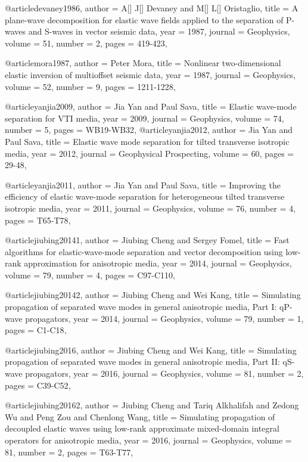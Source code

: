 @article{devaney1986,
author = {A[] J[] Devaney and M[] L[] Oristaglio},
title = {A plane-wave decomposition for elastic wave fields applied to the separation of P-waves and S-waves in vector seismic data},
year = {1987},
journal = {Geophysics},
volume = {51},
number = {2},
pages = {419-423},
}

@article{mora1987,
author = {Peter Mora},
title = {Nonlinear two-dimensional elastic inversion of multioffset seismic data},
year = {1987},
journal = {Geophysics},
volume = {52},
number = {9},
pages = {1211-1228},
}

@article{yanjia2009,
author = {Jia Yan and Paul Sava},
title = {Elastic wave-mode separation for VTI media},
year = {2009},
journal = {Geophysics},
volume = {74},
number = {5},
pages = {WB19-WB32},
}
@article{yanjia2012,
author = {Jia Yan and Paul Sava},
title = {Elastic wave mode separation for tilted transverse isotropic media},
year = {2012},
journal = {Geophysical Prospecting},
volume = {60},
pages = {29-48},
}

@article{yanjia2011,
author = {Jia Yan and Paul Sava},
title = {Improving the efficiency of elastic wave-mode separation for heterogeneous tilted transverse isotropic media},
year = {2011},
journal = {Geophysics},
volume = {76},
number = {4},
pages = {T65-T78},
}

@article{jiubing20141,
author = {Jiubing Cheng and Sergey Fomel},
title = {Fast algorithms for elastic-wave-mode separation and vector decomposition using low-rank approximation for anisotropic media},
year = {2014},
journal = {Geophysics},
volume = {79},
number = {4},
pages = {C97-C110},
}

@article{jiubing20142,
author = {Jiubing Cheng and Wei Kang},
title = {Simulating propagation of separated wave modes in general anisotropic media, Part I: qP-wave propagators},
year = {2014},
journal = {Geophysics},
volume = {79},
number = {1},
pages = {C1-C18},
}

@article{jiubing2016,
author = {Jiubing Cheng and Wei Kang},
title = {Simulating propagation of separated wave modes in general anisotropic media, Part II: qS-wave propagators},
year = {2016},
journal = {Geophysics},
volume = {81},
number = {2},
pages = {C39-C52},
}

@article{jiubing20162,
author = {Jiubing Cheng and Tariq Alkhalifah and Zedong Wu and Peng Zou and Chenlong Wang},
title = {Simulating propagation of decoupled elastic waves using low-rank approximate mixed-domain integral operators for anisotropic media},
year = {2016},
journal = {Geophysics},
volume = {81},
number = {2},
pages = {T63-T77},
}

